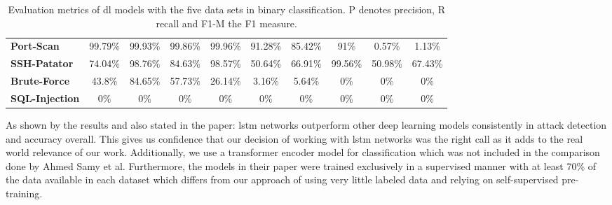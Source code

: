 \begin{table}[h]
{\begin{tabular}{l|c|c|c|c|c|c|c|c|c}
		\textbf{Port-Scan} & 99.79\%  & 99.93\%  & 99.86\%     & 99.96\%  & 91.28\%  & 85.42\%     & 91\%      & 0.57\%   & 1.13\%      \\
		\textbf{SSH-Patator} & 74.04\%  & 98.76\%  & 84.63\%     & 98.57\%  & 50.64\%  & 66.91\%     & 99.56\%   & 50.98\%  & 67.43\%     \\
		\textbf{Brute-Force} & 43.8\%   & 84.65\%  & 57.73\%     & 26.14\%  & 3.16\%   & 5.64\%      & 0\%       & 0\%      & 0\%         \\
		\textbf{SQL-Injection} & 0\%      & 0\%      & 0\%         & 0\%      & 0\%      & 0\%         & 0\%       & 0\%      & 0\%        
	\end{tabular}}
	\caption{Evaluation metrics of \gls{dl} models with the five data sets in binary classification. P denotes precision, R recall and F1-M the F1 measure. \cite{fog_based_detection_survey_2020}}
	\label{table:stateofart:fog_based_detection_survey_2020_results_class}
\end{table}

As shown by the results and also stated in the paper: \gls{lstm} networks outperform other deep learning models consistently in attack detection and accuracy overall. This gives us confidence that our decision of working with \gls{lstm} networks was the right call as it adds to the real world relevance of our work. Additionally, we use a transformer encoder model for classification which was not included in the comparison done by Ahmed Samy et al. Furthermore, the models in their paper were trained exclusively in a supervised manner with at least 70\% of the data available in each dataset which differs from our approach of using very little labeled data and relying on self-supervised pre-training. \par

